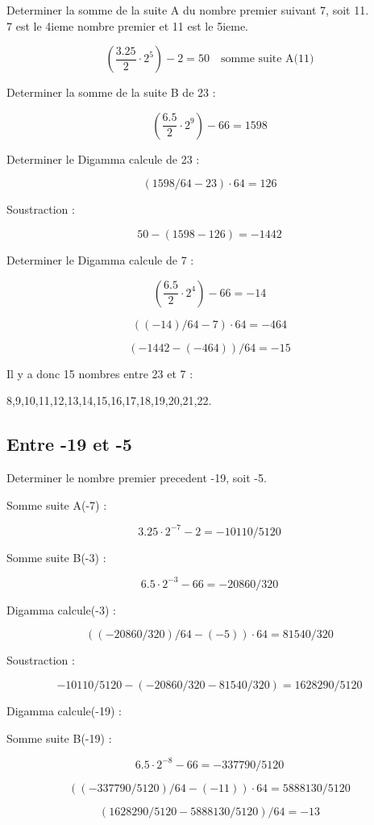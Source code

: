 \documentclass[a4paper,11pt]{article}
\begin{document}
Determiner la somme de la suite A du nombre premier suivant 7, soit 11.\\
7 est le 4ieme nombre premier et 11 est le 5ieme.

\[
\left(\frac{3.25}{2} \cdot 2^{5}\right) - 2 = 50 \quad \text{somme suite A(11)}
\]

Determiner la somme de la suite B de 23 :

\[
\left(\frac{6.5}{2} \cdot 2^{9}\right) - 66 = 1598
\]

Determiner le Digamma calcule de 23 :

\[
(1598/64 - 23) \cdot 64 = 126
\]

Soustraction :

\[
50 - (1598 - 126) = -1442
\]

Determiner le Digamma calcule de 7 :

\[
\left(\frac{6.5}{2} \cdot 2^{4}\right) - 66 = -14
\]

\[
((-14)/64 - 7) \cdot 64 = -464
\]

\[
(-1442 - (-464))/64 = -15
\]

Il y a donc 15 nombres entre 23 et 7 :

8,9,10,11,12,13,14,15,16,17,18,19,20,21,22.

\subsection*{Entre -19 et -5}

Determiner le nombre premier precedent -19, soit -5.

Somme suite A(-7) :

\[
3.25 \cdot 2^{-7} - 2 = -10110/5120
\]

Somme suite B(-3) :

\[
6.5 \cdot 2^{-3} - 66 = -20860/320
\]

Digamma calcule(-3) :

\[
((-20860/320)/64 - (-5)) \cdot 64 = 81540/320
\]

Soustraction :

\[
-10110/5120 - (-20860/320 - 81540/320) = 1628290/5120
\]

Digamma calcule(-19) :

Somme suite B(-19) :

\[
6.5 \cdot 2^{-8} - 66 = -337790/5120
\]

\[
((-337790/5120)/64 - (-11)) \cdot 64 = 5888130/5120
\]

\[
(1628290/5120 - 5888130/5120)/64 = -13
\]
\end{document}
